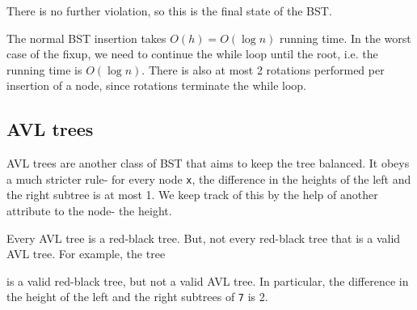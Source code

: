 \documentclass[a4paper, openany]{memoir}
\begin{document}
\begin{center}
\end{center}
There is no further violation, so this is the final state of the BST.

\noindent The normal BST insertion takes $O(h) = O(\log n)$ running time. In the worst case of the fixup, we need to continue the while loop until the root, i.e. the running time is $O(\log n)$. There is also at most 2 rotations performed per insertion of a node, since rotations terminate the while loop.

\subsection{AVL trees}
AVL trees are another class of BST that aims to keep the tree balanced. It obeys a much stricter rule- for every node \texttt{x}, the difference in the heights of the left and the right subtree is at most 1. We keep track of this by the help of another attribute to the node- the height.

\noindent Every AVL tree is a red-black tree. But, not every red-black tree that is a valid AVL tree. For example, the tree
\begin{center}
\end{center}
is a valid red-black tree, but not a valid AVL tree. In particular, the difference in the height of the left and the right subtrees of \texttt{7} is 2.
\end{document}
